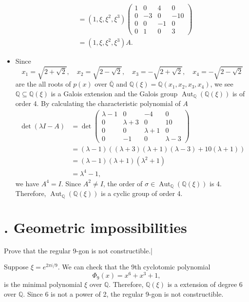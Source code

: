 \begin{solution}
\begin{itemize}
\begin{align*}
			&=\left(1, \xi, \xi^2, \xi^3\right)
			\begin{pmatrix}
				1&0&4&0\\
				0&-3&0&-10\\
				0&0&-1&0\\
				0&1&0&3
			\end{pmatrix}\\
			&=\left(1, \xi, \xi^2, \xi^3\right)A.
		\end{align*}
		\item Since
		\[
			x_1=\sqrt{2+\sqrt{2}},\quad x_2=\sqrt{2-\sqrt{2}},\quad x_3=-\sqrt{2+\sqrt{2}},\quad x_4=-\sqrt{2-\sqrt{2}}
		\]
		are the all roots of $p(x)$ over $\overline{\mathbb{Q}}$ and $\mathbb{Q}(\xi)=\mathbb{Q}(x_1,x_2,x_3,x_4)$, we see $\mathbb{Q}\subseteq\mathbb{Q}(\xi)$ is a Galois extension and the Galois group $\operatorname{Aut}_{\mathbb{Q}}(\mathbb{Q}(\xi))$ is of order 4. By calculating the characteristic polynomial of $A$
		\begin{align*}
			\det\left(\lambda I-A\right)&=\det \begin{pmatrix}
				\lambda-1&0&-4&0\\
				0&\lambda+3&0&10\\
				0&0&\lambda+1&0\\
				0&-1&0&\lambda-3
			\end{pmatrix}\\
			&=(\lambda-1)\left((\lambda+3)(\lambda+1)(\lambda-3)+10(\lambda+1)\right)\\
			&=(\lambda-1)(\lambda+1)\left(\lambda^2+1\right)\\
			&=\lambda^4-1,
		\end{align*}
		we have $A^4=I$. Since $A^2\ne I$, the order of $\sigma\in \operatorname{Aut}_{\mathbb{Q}}(\mathbb{Q}(\xi))$ is 4. Therefore, $\operatorname{Aut}_{\mathbb{Q}}(\mathbb{Q}(\xi))$ is a cyclic group of order 4.
	\end{itemize}
\end{solution}

\section{. Geometric impossibilities}
\begin{problem}[3.14]
Prove that the regular 9-gon is not constructible.|
\end{problem}
\begin{solution}
Suppose $\xi=e^{2\pi i/9}$. We can check that the 9th cyclotomic polynomial 
\[
	\Phi_9(x)=x^6+x^3+1,
\]
is the minimal polynomial $\xi$ over $\mathbb{Q}$. Therefore, $\mathbb{Q}(\xi)$ is a extension of degree 6 over $\mathbb{Q}$. Since 6 is not a power of 2, the regular 9-gon is not constructible.
\end{solution}

